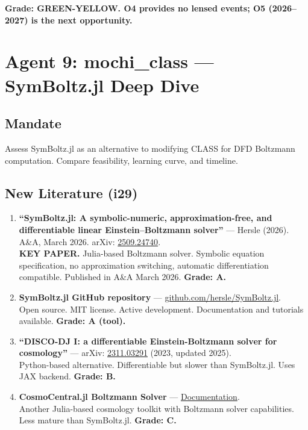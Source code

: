 \documentclass[11pt,a4paper]{article}
\begin{document}
\textbf{Grade: GREEN-YELLOW. O4 provides no lensed events; O5 (2026--2027) is the next opportunity.}

\section{Agent 9: mochi\_class --- SymBoltz.jl Deep Dive}

\subsection{Mandate}
Assess SymBoltz.jl as an alternative to modifying CLASS for DFD Boltzmann computation. Compare feasibility, learning curve, and timeline.

\subsection{New Literature (i29)}

\begin{enumerate}
\item \textbf{``SymBoltz.jl: A symbolic-numeric, approximation-free, and differentiable linear Einstein--Boltzmann solver''} --- Hersle (2026). A\&A, March 2026. arXiv: \href{https://arxiv.org/abs/2509.24740}{2509.24740}.\\
\textbf{KEY PAPER.} Julia-based Boltzmann solver. Symbolic equation specification, no approximation switching, automatic differentiation compatible. Published in A\&A March 2026. \textbf{Grade: A.}

\item \textbf{SymBoltz.jl GitHub repository} --- \href{https://github.com/hersle/SymBoltz.jl}{github.com/hersle/SymBoltz.jl}.\\
Open source. MIT license. Active development. Documentation and tutorials available. \textbf{Grade: A (tool).}

\item \textbf{``DISCO-DJ I: a differentiable Einstein-Boltzmann solver for cosmology''} --- arXiv: \href{https://arxiv.org/abs/2311.03291}{2311.03291} (2023, updated 2025).\\
Python-based alternative. Differentiable but slower than SymBoltz.jl. Uses JAX backend. \textbf{Grade: B.}

\item \textbf{CosmoCentral.jl Boltzmann Solver} --- \href{https://www.marcobonici.com/CosmoCentral.jl/dev/BoltzmannSolver/}{Documentation}.\\
Another Julia-based cosmology toolkit with Boltzmann solver capabilities. Less mature than SymBoltz.jl. \textbf{Grade: C.}
\end{enumerate}
\end{document}
